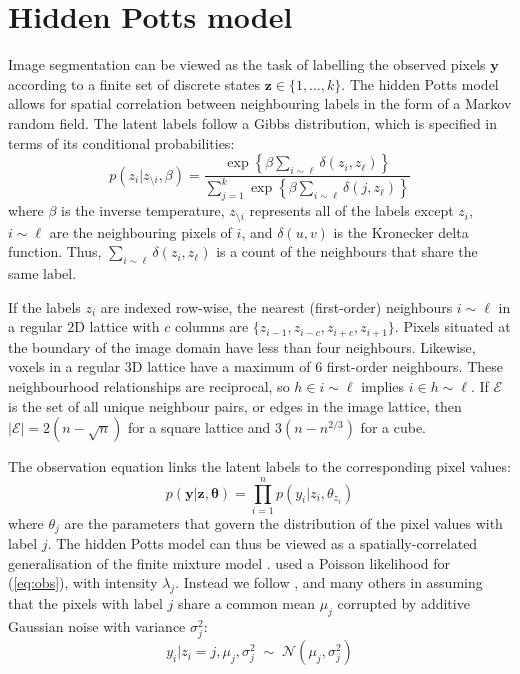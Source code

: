 \documentclass[nojss,shortnames]{jss}\usepackage[]{graphicx}\usepackage[]{color}
\begin{document}
\section{Hidden Potts model}
\label{s:model}
Image segmentation can be viewed as the task of labelling the observed pixels $\mathbf{y}$ according to a finite set of discrete states $\mathbf{z} \in \{ 1, \dots, k \}$. The hidden Potts model allows for spatial correlation between neighbouring labels in the form of a Markov random field. The latent labels follow a Gibbs distribution, which is specified in terms of its conditional probabilities:
  \begin{equation}
  \label{eq:Potts}
  p(z_i | z_{\setminus i}, \beta) = \frac{\exp\left\{\beta\sum_{i \sim \ell}\delta(z_i,z_\ell)\right\}}{\sum_{j=1}^k \exp\left\{\beta\sum_{i \sim \ell}\delta(j,z_\ell)\right\}}
  \end{equation}
  where $\beta$ is the inverse temperature, $z_{\setminus i}$ represents all of the labels except $z_i$, $i \sim \ell$ are the  neighbouring pixels of $i$, and $\delta(u,v)$ is the Kronecker delta function. Thus, $\sum_{i \sim \ell}\delta(z_i,z_\ell)$ is a count of the neighbours that share the same label.

If the labels $z_i$ are indexed row-wise, the nearest (first-order) neighbours $i \sim \ell$ in a regular 2D lattice with $c$ columns are $\{ z_{i-1}, z_{i-c}, z_{i+c}, z_{i+1} \}$. Pixels situated at the boundary of the image domain have less than four neighbours. Likewise, voxels in a regular 3D lattice have a maximum of 6 first-order neighbours. These neighbourhood relationships are reciprocal, so $h \in i \sim \ell$ implies $i \in h \sim \ell$. If $\mathcal{E}$ is the set of all unique neighbour pairs, or edges in the image lattice, then $| \mathcal{E} | = 2(n - \sqrt{n})$ for a square lattice and $3(n - n^{2/3})$ for a cube.

The observation equation links the latent labels to the corresponding pixel values:
  \begin{equation}
  \label{eq:obs}
  p(\mathbf{y} | \mathbf{z}, \boldsymbol\theta) = \prod_{i=1}^n p(y_i | z_i, \theta_{z_i})
  \end{equation}
  where $\theta_{j}$ are the parameters that govern the distribution of the pixel values with label $j$. The hidden Potts model can thus be viewed as a spatially-correlated generalisation of the finite mixture model \citep{Ryden1998}. \citet{Green2002} used a Poisson likelihood for (\ref{eq:obs}), with intensity $\lambda_j$. Instead we follow \citet{Geman1984,Alston2007}, and many others in assuming that the pixels with label $j$ share a common mean $\mu_j$ corrupted by additive Gaussian noise with variance $\sigma_j^2$:
  \begin{equation}
  \label{eq:obs2}
y_i | z_i=j, \mu_j, \sigma^2_j \;\sim\; \mathcal{N}\left( \mu_j, \sigma^2_j \right)
  \end{equation}
 
\end{document}
